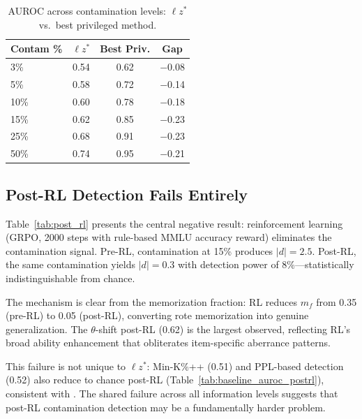 \documentclass[11pt,a4paper]{article}
\newcommand{\lzstar}{\ensuremath{\ell z^*}}
\begin{document}
\begin{table}[t]
\centering
\small
\caption{AUROC across contamination levels: $\lzstar$ vs.\ best privileged method.}
\label{tab:auroc_by_level}
\begin{tabular}{lccc}
\toprule
\textbf{Contam \%} & $\lzstar$ & \textbf{Best Priv.} & \textbf{Gap} \\
\midrule
3\% & 0.54 & 0.62 & $-$0.08 \\
5\% & 0.58 & 0.72 & $-$0.14 \\
10\% & 0.60 & 0.78 & $-$0.18 \\
15\% & 0.62 & 0.85 & $-$0.23 \\
25\% & 0.68 & 0.91 & $-$0.23 \\
50\% & 0.74 & 0.95 & $-$0.21 \\
\bottomrule
\end{tabular}
\end{table}

\subsection{Post-RL Detection Fails Entirely}
\label{sec:post_rl}

Table~\ref{tab:post_rl} presents the central negative result: reinforcement learning (GRPO, 2000 steps with rule-based MMLU accuracy reward) eliminates the contamination signal.
Pre-RL, contamination at 15\% produces $|d|=2.5$.
Post-RL, the same contamination yields $|d|=0.3$ with detection power of 8\%---statistically indistinguishable from chance.

The mechanism is clear from the memorization fraction: RL reduces $m_f$ from 0.35 (pre-RL) to 0.05 (post-RL), converting rote memorization into genuine generalization.
The $\theta$-shift post-RL (0.62) is the largest observed, reflecting RL's broad ability enhancement that obliterates item-specific aberrance patterns.

This failure is not unique to $\lzstar$: Min-K\%++ (0.51) and PPL-based detection (0.52) also reduce to chance post-RL (Table~\ref{tab:baseline_auroc_postrl}), consistent with \citet{wang2025rlcontam}.
The shared failure across all information levels suggests that post-RL contamination detection may be a fundamentally harder problem.
\end{document}
